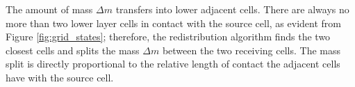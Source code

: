 The amount of mass $\Delta m$ transfers into lower adjacent cells. There are always no more than two lower layer cells in contact with the source cell, as evident from Figure \ref{fig:grid_states}; therefore, the redistribution algorithm finds the two closest cells and splits the mass $\Delta m$ between the two receiving cells. The mass split is directly proportional to the relative length of contact the adjacent cells have with the source cell.   


%
%
%
%


